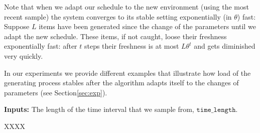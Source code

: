  Note that when we adapt our schedule to the new environment (using the most recent sample) the system converges to its stable setting exponentially (in $\theta$) fast: Suppose $L$ items have been generated since the change of the parameters until we adapt the new schedule. These items, if not caught, loose their freshness exponentially fast: after $t$ steps their freshness is at most $L\theta^t$ and gets diminished very quickly.

 In our experiments we provide different examples that illustrate how load of the generating process stables after the algorithm adapts itself to the changes of parameters (see Section\ref{sec:exp}).


\begin{algorithm}[!h]
\BlankLine
{\bf Inputs:} The length of the time interval that we sample from, $\texttt{time\_length}$.


\caption{XXXX}\label{alg:sampler}
\end{algorithm}


%
%
%










